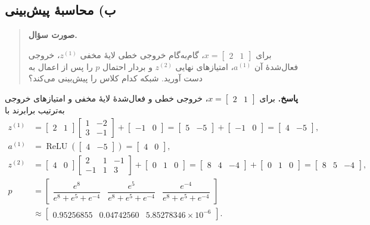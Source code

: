 \documentclass{article}
\numberwithin{equation}{section}
\numberwithin{table}{section}
\DeclareMathOperator{\ReLU}{ReLU}
\newenvironment{questionprompt}{%
    \begin{quote}\noindent\textbf{صورت سؤال.}\enspace\ignorespaces
}{%
    \end{quote}\noindent\textbf{پاسخ.}\enspace\ignorespacesafterend
}
\begin{document}
\subsection*{ب) محاسبهٔ پیش‌بینی}
\begin{questionprompt}
    برای \(x=\begin{bmatrix}2&1\end{bmatrix}\)، گام‌به‌گام خروجی خطی لایهٔ مخفی \(z^{(1)}\)، خروجی فعال‌شدهٔ آن \(a^{(1)}\)، امتیازهای نهایی \(z^{(2)}\) و بردار احتمال \(p\) را پس از اعمال  به دست آورید. شبکه کدام کلاس را پیش‌بینی می‌کند؟
\end{questionprompt}
برای \(x=\begin{bmatrix}2&1\end{bmatrix}\)، خروجی خطی و فعال‌شدهٔ لایهٔ مخفی و امتیازهای خروجی به‌ترتیب برابرند با
\begin{align*}
    z^{(1)}
    &=\begin{bmatrix}2&1\end{bmatrix}\begin{bmatrix}1&-2\\3&-1\end{bmatrix}
      +\begin{bmatrix}-1&0\end{bmatrix}
     =\begin{bmatrix}5&-5\end{bmatrix}+\begin{bmatrix}-1&0\end{bmatrix}
     =\begin{bmatrix}4&-5\end{bmatrix},\\
    a^{(1)}
    &=\ReLU\!\left(\begin{bmatrix}4&-5\end{bmatrix}\right)
     =\begin{bmatrix}4&0\end{bmatrix},\\
    z^{(2)}
    &=\begin{bmatrix}4&0\end{bmatrix}\begin{bmatrix}2&1&-1\\-1&1&3\end{bmatrix}
      +\begin{bmatrix}0&1&0\end{bmatrix}
     =\begin{bmatrix}8&4&-4\end{bmatrix}+\begin{bmatrix}0&1&0\end{bmatrix}
     =\begin{bmatrix}8&5&-4\end{bmatrix},\\
    p
    &=\begin{bmatrix}
        \dfrac{e^8}{e^8+e^5+e^{-4}} &
        \dfrac{e^5}{e^8+e^5+e^{-4}} &
        \dfrac{e^{-4}}{e^8+e^5+e^{-4}}
    \end{bmatrix}\\
    &\approx\begin{bmatrix}0.95256855&0.04742560&5.85278346\times10^{-6}\end{bmatrix}.
\end{align*}
\end{document}
